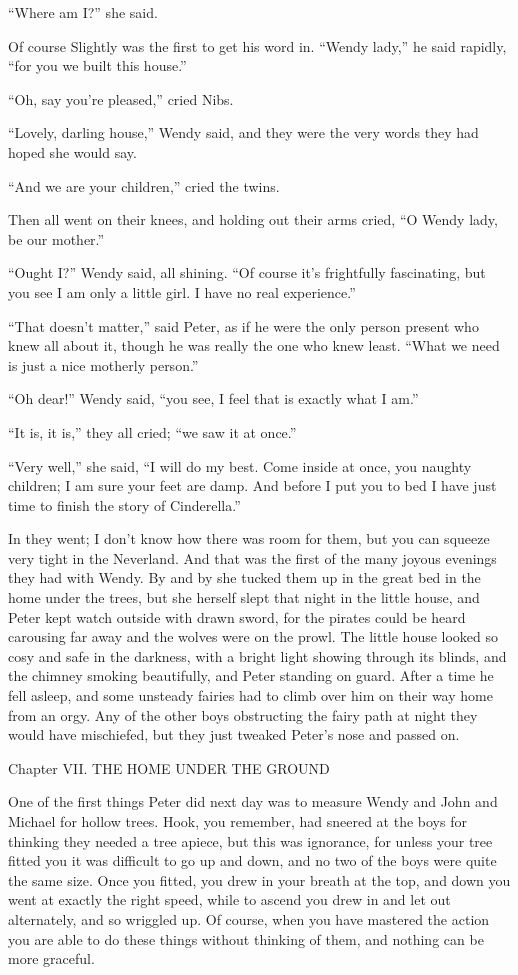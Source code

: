 ``Where am I?'' she said.

Of course Slightly was the first to get his word in. ``Wendy lady,'' he
said rapidly, ``for you we built this house.''

``Oh, say you're pleased,'' cried Nibs.

``Lovely, darling house,'' Wendy said, and they were the very words they
had hoped she would say.

``And we are your children,'' cried the twins.

Then all went on their knees, and holding out their arms cried, ``O
Wendy lady, be our mother.''

``Ought I?'' Wendy said, all shining. ``Of course it's frightfully
fascinating, but you see I am only a little girl. I have no real
experience.''

``That doesn't matter,'' said Peter, as if he were the only person
present who knew all about it, though he was really the one who knew
least. ``What we need is just a nice motherly person.''

``Oh dear!'' Wendy said, ``you see, I feel that is exactly what I am.''

``It is, it is,'' they all cried; ``we saw it at once.''

``Very well,'' she said, ``I will do my best. Come inside at once, you
naughty children; I am sure your feet are damp. And before I put you to
bed I have just time to finish the story of Cinderella.''

In they went; I don't know how there was room for them, but you can
squeeze very tight in the Neverland. And that was the first of the many
joyous evenings they had with Wendy. By and by she tucked them up in
the great bed in the home under the trees, but she herself slept that
night in the little house, and Peter kept watch outside with drawn
sword, for the pirates could be heard carousing far away and the wolves
were on the prowl. The little house looked so cosy and safe in the
darkness, with a bright light showing through its blinds, and the
chimney smoking beautifully, and Peter standing on guard. After a time
he fell asleep, and some unsteady fairies had to climb over him on
their way home from an orgy. Any of the other boys obstructing the
fairy path at night they would have mischiefed, but they just tweaked
Peter's nose and passed on.




Chapter VII.
THE HOME UNDER THE GROUND


One of the first things Peter did next day was to measure Wendy and
John and Michael for hollow trees. Hook, you remember, had sneered at
the boys for thinking they needed a tree apiece, but this was
ignorance, for unless your tree fitted you it was difficult to go up
and down, and no two of the boys were quite the same size. Once you
fitted, you drew in your breath at the top, and down you went at
exactly the right speed, while to ascend you drew in and let out
alternately, and so wriggled up. Of course, when you have mastered the
action you are able to do these things without thinking of them, and
nothing can be more graceful.


